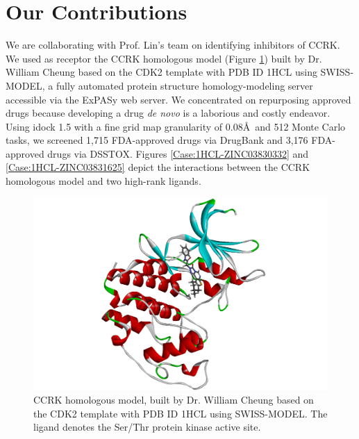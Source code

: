 \section{Our Contributions}

We are collaborating with Prof. Lin's team on identifying inhibitors of CCRK. We used as receptor the CCRK homologous model (Figure \ref{Case:CCRKHomologousModel}) built by Dr. William Cheung based on the CDK2 template with PDB ID 1HCL \citep{1142} using SWISS-MODEL, a fully automated protein structure homology-modeling server accessible via the ExPASy web server. We concentrated on repurposing approved drugs \citep{944,1023} because developing a drug \textit{de novo} is a laborious and costly endeavor. Using idock 1.5 with a fine grid map granularity of 0.08\AA\ and 512 Monte Carlo tasks, we screened 1,715 FDA-approved drugs via DrugBank and 3,176 FDA-approved drugs via DSSTOX. Figures \ref{Case:1HCL-ZINC03830332} and \ref{Case:1HCL-ZINC03831625} depict the interactions between the CCRK homologous model and two high-rank ligands.

\begin{figure}
\centering
\includegraphics[width=\linewidth]{../ccrk/CCRKHomologousModel.png}
\caption{CCRK homologous model, built by Dr. William Cheung based on the CDK2 template with PDB ID 1HCL \citep{1142} using SWISS-MODEL. The ligand denotes the Ser/Thr protein kinase active site.}
\label{Case:CCRKHomologousModel}
\end{figure}

